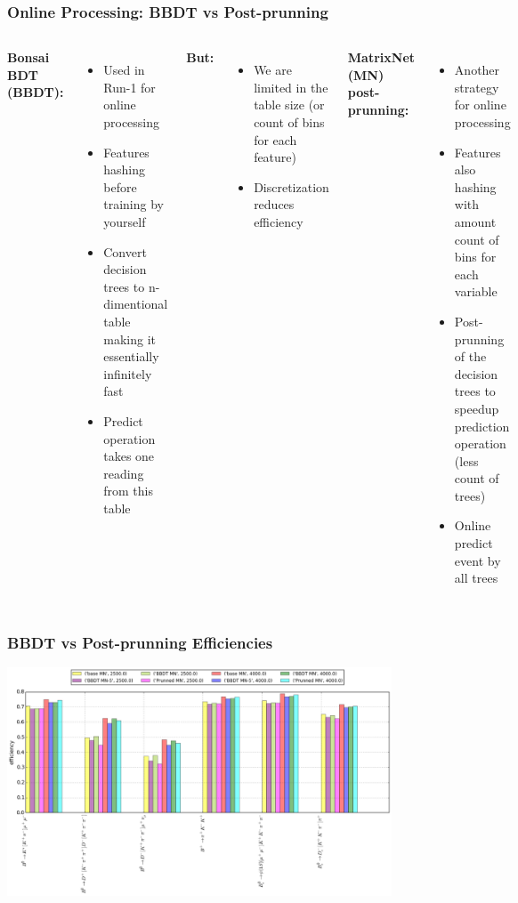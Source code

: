 \documentclass[xcolor=svgnames]{beamer}
\begin{document}
\begin{frame}\frametitle{Online Processing: BBDT vs Post-prunning}
\begin{columns}[T]
\column{2.4in}
\hspace*{1cm} {\bf Bonsai BDT (BBDT):}
\begin{itemize}
	\item Used in Run-1 for online processing
	\item Features hashing before training by yourself
	\item Convert decision trees to n-dimentional table making it essentially infinitely fast
	\item Predict operation takes one reading from this table
\end{itemize}
{\bf But: }
\begin{itemize}
	\item We are limited in the table size (or count of bins for each feature)
	\item Discretization reduces efficiency
\end{itemize}
\column{2.4in}
\hspace*{1cm} {\bf MatrixNet (MN) post-prunning:}
\begin{itemize}
	\item Another strategy for online processing
	\item Features also hashing with amount count of bins for each variable
	\item Post-prunning of the decision trees to speedup prediction operation (less count of trees)
	\item Online predict event by all trees
\end{itemize}
\end{columns}
\end{frame}


\begin{frame}\frametitle{BBDT vs Post-prunning Efficiencies}
\begin{center}
\includegraphics[width=4.5in]{images/prun-base.png} 
\end{center}
\end{frame}
\end{document}
